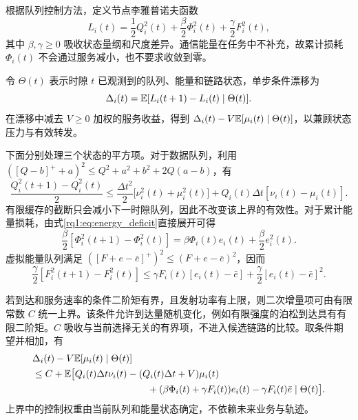 根据队列控制方法\cite{algo1,algo2,intro13}，定义节点李雅普诺夫函数
\begin{equation}
 L_i(t)=\frac{1}{2}Q_i^2(t)+\frac{\beta}{2}\Phi_i^2(t)
                 +\frac{\gamma}{2}F_i^2(t),
 \label{rq1:eq:lyapunov}
\end{equation}
其中 $\beta,\gamma\ge0$ 吸收状态量纲和尺度差异。通信能量在任务中不补充，故累计损耗 $\Phi_i(t)$ 不会通过服务减小，也不要求收敛到零。

令 $\Theta(t)$ 表示时隙 $t$ 已观测到的队列、能量和链路状态，单步条件漂移为
\begin{equation}
 \Delta_i(t)=\mathbb{E}[L_i(t+1)-L_i(t)\mid\Theta(t)].
 \label{rq1:eq:drift}
\end{equation}
在漂移中减去 $V\ge0$ 加权的服务收益，得到 $\Delta_i(t)-V\mathbb{E}[\mu_i(t)\mid\Theta(t)]$，以兼顾状态压力与有效转发。

下面分别处理三个状态的平方项。对于数据队列，利用 $([Q-b]^++a)^2\le Q^2+a^2+b^2+2Q(a-b)$，有
\begin{equation}
 \frac{Q_i^2(t+1)-Q_i^2(t)}{2}
 \le\frac{\Delta t^2}{2}\bigl[\nu_i^2(t)+\mu_i^2(t)\bigr]
       +Q_i(t)\Delta t[\nu_i(t)-\mu_i(t)].
 \label{rq1:eq:queue_drift}
\end{equation}
有限缓存的截断只会减小下一时隙队列，因此不改变该上界的有效性。对于累计能量损耗，由式\eqref{rq1:eq:energy_deficit}直接展开可得
\begin{equation}
 \frac{\beta}{2}[\Phi_i^2(t+1)-\Phi_i^2(t)]
 =\beta\Phi_i(t)e_i(t)+\frac{\beta}{2}e_i^2(t).
 \label{rq1:eq:energy_drift}
\end{equation}
虚拟能量队列满足 $([F+e-\bar e]^+)^2\le(F+e-\bar e)^2$，因而
\begin{equation}
 \frac{\gamma}{2}[F_i^2(t+1)-F_i^2(t)]
 \le\gamma F_i(t)[e_i(t)-\bar e]
       +\frac{\gamma}{2}[e_i(t)-\bar e]^2.
 \label{rq1:eq:virtual_drift}
\end{equation}

若到达和服务速率的条件二阶矩有界，且发射功率有上限，则二次增量项可由有限常数 $C$ 统一上界。该条件允许到达量随机变化，例如有限强度的泊松到达具有有限二阶矩。$C$ 吸收与当前选择无关的有界项，不进入候选链路的比较。取条件期望并相加，有
\begin{align}
 &\Delta_i(t)-V\E[\mu_i(t)\mid\Theta(t)]\nonumber\\
 &\quad\le C+\E\bigl[Q_i(t)\Delta t\nu_i(t)
       -(Q_i(t)\Delta t+V)\mu_i(t)\nonumber\\
 &\hspace{42mm}
       +(\beta\Phi_i(t)+\gamma F_i(t))e_i(t)
       -\gamma F_i(t)\bar e\mid\Theta(t)\bigr].
 \label{rq1:eq:dpp_bound}
\end{align}
上界中的控制权重由当前队列和能量状态确定，不依赖未来业务与轨迹。

